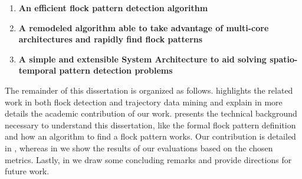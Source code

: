\begin{enumerate}
    \item \textbf{An efficient flock pattern detection algorithm}
    \item \textbf{A remodeled algorithm able to take advantage of multi-core architectures and rapidly find flock
        patterns}
    \item \textbf{A simple and extensible System Architecture to aid solving spatio-temporal pattern detection problems}
\end{enumerate}

The remainder of this dissertation is organized as follows.  highlights the related work in
both flock detection and trajectory data mining and explain in more details the academic contribution of our work.
 presents the technical background necessary to understand this dissertation, like the
formal flock pattern definition and how an algorithm to find a flock pattern works. Our contribution is detailed in
, whereas in  we show the results of our evaluations based on the chosen
metrics. Lastly, in  we draw some concluding remarks and provide directions for future work.
